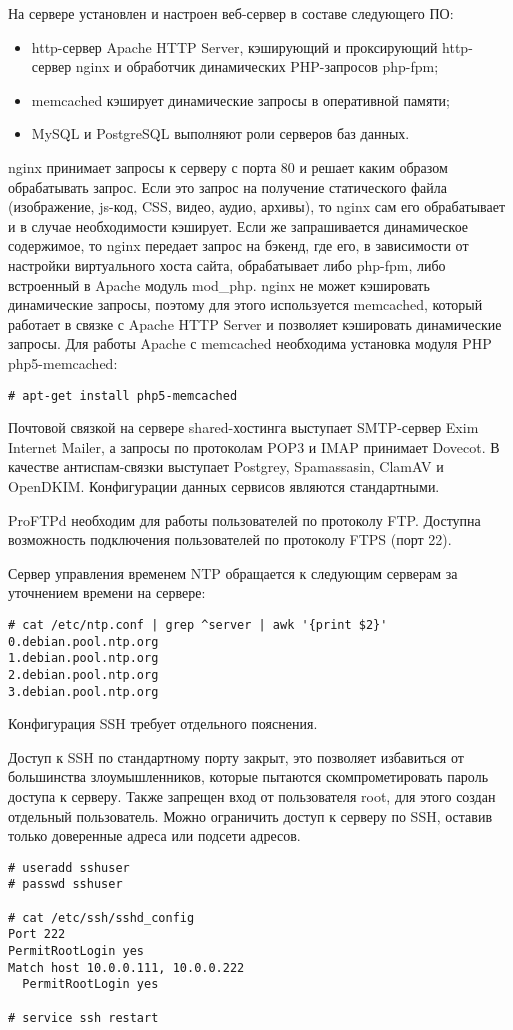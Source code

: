 На сервере установлен и настроен веб-сервер в составе следующего ПО:
\begin{itemize}
  \item http-сервер Apache HTTP Server, кэширующий и проксирующий http-сервер nginx и обработчик динамических PHP-запросов php-fpm;
  \item memcached кэширует динамические запросы в оперативной памяти;
  \item MySQL и PostgreSQL выполняют роли серверов баз данных.
\end{itemize}

nginx принимает запросы к серверу с порта 80 и решает каким образом обрабатывать запрос.
Если это запрос на получение статического файла (изображение, js-код, CSS, видео, аудио, архивы), то nginx сам его обрабатывает и в случае необходимости кэширует.
Если же запрашивается динамическое содержимое, то nginx передает запрос на бэкенд, где его, в зависимости от настройки виртуального хоста сайта, обрабатывает либо php-fpm, либо встроенный в Apache модуль mod\_php.
nginx не может кэшировать динамические запросы, поэтому для этого используется memcached, который работает в связке с Apache HTTP Server и позволяет кэшировать динамические запросы.
Для работы Apache с memcached необходима установка модуля PHP php5-memcached:
\begin{lstlisting}
# apt-get install php5-memcached
\end{lstlisting}

Почтовой связкой на сервере shared-хостинга выступает SMTP-сервер Exim Internet Mailer, а запросы по протоколам POP3 и IMAP принимает Dovecot.
В качестве антиспам-связки выступает Postgrey, Spamassasin, ClamAV и OpenDKIM.
Конфигурации данных сервисов являются стандартными.

ProFTPd необходим для работы пользователей по протоколу FTP.
Доступна возможность подключения пользователей по протоколу FTPS (порт 22).

Сервер управления временем NTP обращается к следующим серверам за уточнением времени на сервере:
\begin{lstlisting}
# cat /etc/ntp.conf | grep ^server | awk '{print $2}'
0.debian.pool.ntp.org
1.debian.pool.ntp.org
2.debian.pool.ntp.org
3.debian.pool.ntp.org
\end{lstlisting}

Конфигурация SSH требует отдельного пояснения.

Доступ к SSH по стандартному порту закрыт, это позволяет избавиться от большинства злоумышленников, которые пытаются скомпрометировать пароль доступа к серверу.
Также запрещен вход от пользователя root, для этого создан отдельный пользователь.
Можно ограничить доступ к серверу по SSH, оставив только доверенные адреса или подсети адресов.
\begin{lstlisting}
# useradd sshuser
# passwd sshuser

# cat /etc/ssh/sshd_config
Port 222
PermitRootLogin yes
Match host 10.0.0.111, 10.0.0.222
  PermitRootLogin yes

# service ssh restart
\end{lstlisting}

